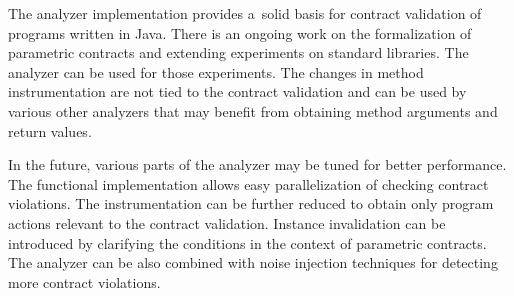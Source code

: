 The analyzer implementation provides a~solid basis for contract validation of
programs written in Java. There is an ongoing work on the formalization of
parametric contracts and extending experiments on standard libraries. The
analyzer can be used for those experiments. The changes in method
instrumentation are not tied to the contract validation and can be used by
various other analyzers that may benefit from obtaining method arguments and
return values.

In the future, various parts of the analyzer may be tuned for better
performance. The functional implementation allows easy parallelization of
checking contract violations. The instrumentation can be further reduced to
obtain only program actions relevant to the contract validation. Instance
invalidation can be introduced by clarifying the conditions in the context of
parametric contracts. The analyzer can be also combined with noise injection
techniques for detecting more contract violations.
